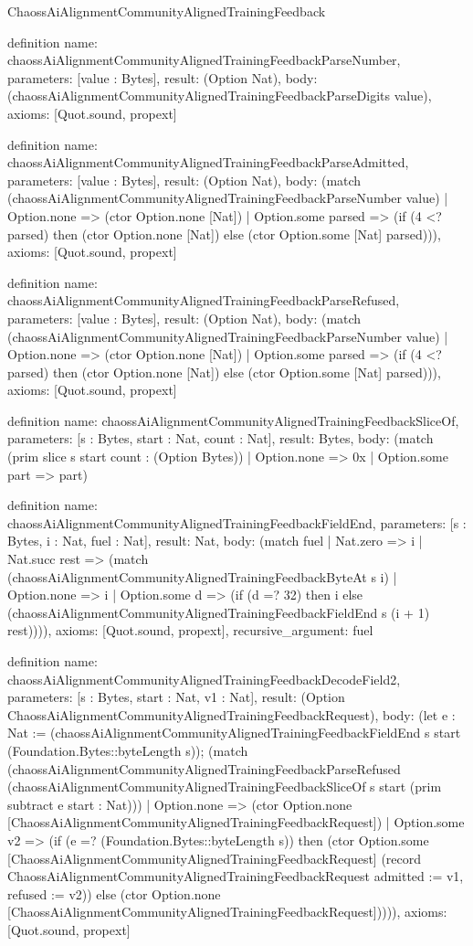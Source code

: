 \begin{lexlean}{ChaossAiAlignmentCommunityAlignedTrainingFeedback}
\begin{semanticmodule}
definition{
  name: chaossAiAlignmentCommunityAlignedTrainingFeedbackParseNumber,
  parameters: [value : Bytes],
  result: (Option Nat),
  body: (chaossAiAlignmentCommunityAlignedTrainingFeedbackParseDigits value),
  axioms: [Quot.sound, propext]
}

definition{
  name: chaossAiAlignmentCommunityAlignedTrainingFeedbackParseAdmitted,
  parameters: [value : Bytes],
  result: (Option Nat),
  body: (match (chaossAiAlignmentCommunityAlignedTrainingFeedbackParseNumber value)
    | Option.none => (ctor Option.none [Nat])
    | Option.some parsed => (if (4 <? parsed) then (ctor Option.none [Nat]) else (ctor Option.some [Nat] parsed))),
  axioms: [Quot.sound, propext]
}

definition{
  name: chaossAiAlignmentCommunityAlignedTrainingFeedbackParseRefused,
  parameters: [value : Bytes],
  result: (Option Nat),
  body: (match (chaossAiAlignmentCommunityAlignedTrainingFeedbackParseNumber value)
    | Option.none => (ctor Option.none [Nat])
    | Option.some parsed => (if (4 <? parsed) then (ctor Option.none [Nat]) else (ctor Option.some [Nat] parsed))),
  axioms: [Quot.sound, propext]
}

definition{
  name: chaossAiAlignmentCommunityAlignedTrainingFeedbackSliceOf,
  parameters: [s : Bytes, start : Nat, count : Nat],
  result: Bytes,
  body: (match (prim slice s start count : (Option Bytes))
    | Option.none => 0x
    | Option.some part => part)
}

definition{
  name: chaossAiAlignmentCommunityAlignedTrainingFeedbackFieldEnd,
  parameters: [s : Bytes, i : Nat, fuel : Nat],
  result: Nat,
  body: (match fuel
    | Nat.zero => i
    | Nat.succ rest => (match (chaossAiAlignmentCommunityAlignedTrainingFeedbackByteAt s i)
      | Option.none => i
      | Option.some d => (if (d =? 32) then i else (chaossAiAlignmentCommunityAlignedTrainingFeedbackFieldEnd s (i + 1) rest)))),
  axioms: [Quot.sound, propext],
  recursive_argument: fuel
}

definition{
  name: chaossAiAlignmentCommunityAlignedTrainingFeedbackDecodeField2,
  parameters: [s : Bytes, start : Nat, v1 : Nat],
  result: (Option ChaossAiAlignmentCommunityAlignedTrainingFeedbackRequest),
  body: (let e : Nat := (chaossAiAlignmentCommunityAlignedTrainingFeedbackFieldEnd s start (Foundation.Bytes::byteLength s)); (match (chaossAiAlignmentCommunityAlignedTrainingFeedbackParseRefused (chaossAiAlignmentCommunityAlignedTrainingFeedbackSliceOf s start (prim subtract e start : Nat)))
    | Option.none => (ctor Option.none [ChaossAiAlignmentCommunityAlignedTrainingFeedbackRequest])
    | Option.some v2 => (if (e =? (Foundation.Bytes::byteLength s)) then (ctor Option.some [ChaossAiAlignmentCommunityAlignedTrainingFeedbackRequest] (record ChaossAiAlignmentCommunityAlignedTrainingFeedbackRequest {admitted := v1, refused := v2})) else (ctor Option.none [ChaossAiAlignmentCommunityAlignedTrainingFeedbackRequest])))),
  axioms: [Quot.sound, propext]
}


\end{semanticmodule}
\end{lexlean}
